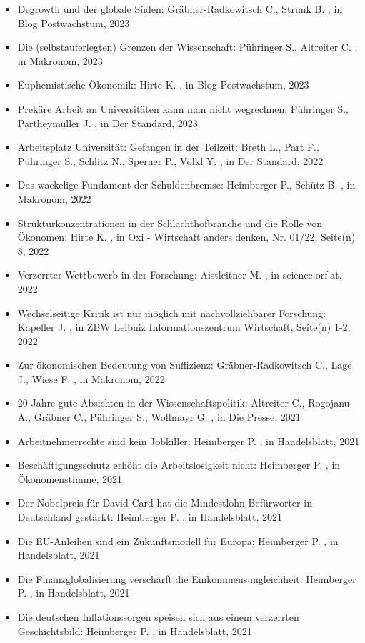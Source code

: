 \begin{itemize}
\item Degrowth und der globale Süden: Gräbner-Radkowitsch C., Strunk B. , in Blog Postwachstum, 2023
\item Die (selbstauferlegten) Grenzen der Wissenschaft: Pühringer S., Altreiter C. , in Makronom, 2023
\item Euphemistische Ökonomik: Hirte K. , in Blog Postwachstum, 2023
\item Prekäre Arbeit an Universitäten kann man nicht wegrechnen: Pühringer S., Partheymüller J. , in Der Standard, 2023
\item Arbeitsplatz Universität: Gefangen in der Teilzeit: Breth L., Part F., Pühringer S., Schlitz N., Sperner P., Völkl Y. , in Der Standard, 2022
\item Das wackelige Fundament der Schuldenbremse: Heimberger P., Schütz B. , in Makronom, 2022
\item Strukturkonzentrationen in der Schlachthofbranche und die Rolle von Ökonomen: Hirte K. , in Oxi - Wirtschaft anders denken, Nr. 01/22, Seite(n) 8, 2022
\item Verzerrter Wettbewerb in der Forschung: Aistleitner M. , in science.orf.at, 2022
\item Wechselseitige Kritik ist nur möglich mit nachvollziehbarer Forschung: Kapeller J. , in ZBW Leibniz Informationszentrum Wirtschaft, Seite(n) 1-2, 2022
\item Zur ökonomischen Bedeutung von Suffizienz: Gräbner-Radkowitsch C., Lage J., Wiese F. , in Makronom, 2022
\item 20 Jahre gute Absichten in der Wissenschaftspolitik: Altreiter C., Rogojanu A., Gräbner C., Pühringer S., Wolfmayr G. , in Die Presse, 2021
\item Arbeitnehmerrechte sind kein Jobkiller: Heimberger P. , in Handelsblatt, 2021
\item Beschäftigungsschutz erhöht die Arbeitslosigkeit nicht: Heimberger P. , in Ökonomenstimme, 2021
\item Der Nobelpreis für David Card hat die Mindestlohn-Befürworter in Deutschland gestärkt: Heimberger P. , in Handelsblatt, 2021
\item Die EU-Anleihen sind ein Zukunftsmodell für Europa: Heimberger P. , in Handelsblatt, 2021
\item Die Finanzglobalisierung verschärft die Einkommensungleichheit: Heimberger P. , in Handelsblatt, 2021
\item Die deutschen Inflationssorgen speisen sich aus einem verzerrten Geschichtsbild: Heimberger P. , in Handelsblatt, 2021

\end{itemize}
